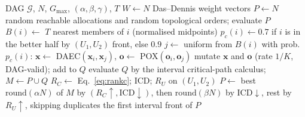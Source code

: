 \begin{algorithm}[!htbp]
\caption{\ours{}}
\label{alg:drimoea}
\small
\begin{algorithmic}[1]
\Require DAG $\mathcal{G}$, $N$, $G_{\max}$, $(\alpha, \beta, \gamma)$, $T$
\State $W \gets N$ Das--Dennis weight vectors
\State $P \gets N$ random reachable allocations and random topological orders; evaluate $P$
  \State $B(i) \gets$ $T$ nearest members of $i$ (normalised midpoints)
  \State $p_c(i) \gets 0.7$ if $i$ is in the better half by $(U_1, U_2)$ front, else $0.9$
    \State $j \gets$ uniform from $B(i)$
    \State with prob.\ $p_c(i)$: $\mathbf{x} \gets$ DAEC$(\mathbf{x}_i, \mathbf{x}_j)$, $\mathbf{o} \gets$ POX$(\mathbf{o}_i, \mathbf{o}_j)$
    \State mutate $\mathbf{x}$ and $\mathbf{o}$ (rate $1/K$, DAG-valid); add to $Q$
  \EndFor
  \State evaluate $Q$ by the interval critical-path calculus; $M \gets P \cup Q$
  \State $R_C \gets$ Eq.~\eqref{eq:rankc}; ICD; $R_U$ on $(U_1, U_2)$
  \State $P \gets$ best $\mathrm{round}(\alpha N)$ of $M$ by $(R_C \uparrow, \mathrm{ICD} \downarrow)$, then
    $\mathrm{round}(\beta N)$ by ICD$\downarrow$, rest by $R_U \uparrow$, skipping duplicates
\EndFor
\State \Return the first interval front of $P$
\end{algorithmic}
\end{algorithm}
